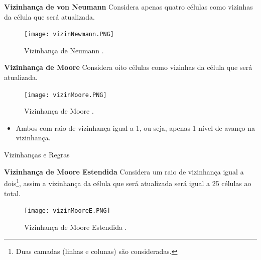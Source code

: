 \documentclass[compress, hide notes]{beamer}
\begin{document}
\begin{frame}

	\begin{minipage}[t]{0.48\linewidth}\centering
		
        \begin{block}{\textbf{Vizinhança de von Neumann}}
			Considera apenas quatro células como vizinhas da célula que será atualizada.
		\end{block}
        
        \begin{figure}[h]

          \center

          \texttt{[image: vizinNewmann.PNG]}
          \caption{Vizinhança de Neumann \cite{ufmg}.}

        \end{figure}

	\end{minipage}\hfill
	\begin{minipage}[t]{0.48\linewidth}\centering
 		
        \begin{block}{\textbf{Vizinhança de Moore}}
		Considera oito células como vizinhas da célula que será atualizada.
		\end{block}
        
          \begin{figure}[h]

              \center

              \texttt{[image: vizinMoore.PNG]}
              \caption{Vizinhança de Moore \cite{ufmg}.}

          \end{figure}

	\end{minipage}
    
    \bigskip
    
    \begin{itemize}
		\item Ambos com raio de vizinhança igual a 1, ou seja, apenas 1 nível de avanço na vizinhança.
	\end{itemize}
\end{frame}


\begin{frame}{Vizinhanças e Regras \cite{ufmg}}
	
	\begin{block}{\textbf{Vizinhança de Moore Estendida}} 
    	Considera um raio de vizinhança igual a dois\footnote{Duas camadas (linhas e colunas) são consideradas.}, assim a vizinhança da célula que será atualizada será igual a 25 células ao total.
	\end{block}
    
	\begin{figure}[h]
		
			\center
							
			\texttt{[image: vizinMooreE.PNG]}
			\caption{Vizinhança de Moore Estendida \cite{ufmg}.}
			
		\end{figure}
	
\end{frame}
\end{document}
